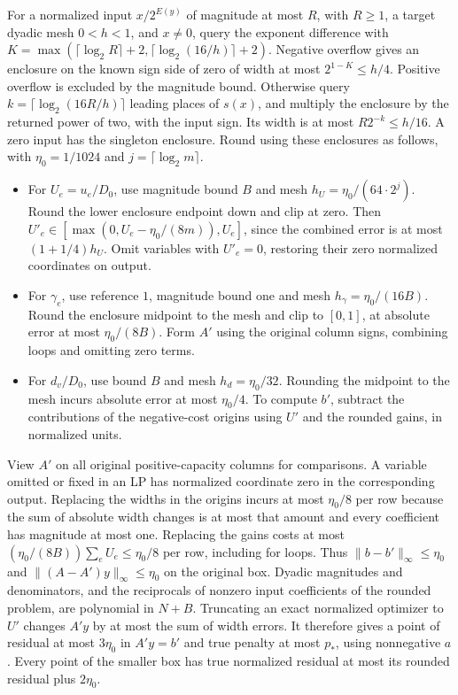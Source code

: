 \documentclass[11pt]{article}
\providecommand{\tightlist}{\setlength{\itemsep}{0pt}\setlength{\parskip}{0pt}}
\begin{document}
For a normalized input \(x/2^{E(y)}\) of magnitude at most \(R\), with \(R\ge1\), a target dyadic mesh \(0<h<1\), and \(x\ne0\), query the exponent difference with \(K=\max(\lceil\log_2 R\rceil+2,\lceil\log_2(16/h)\rceil+2)\). Negative overflow gives an enclosure on the known sign side of zero of width at most \(2^{1-K}\le h/4\). Positive overflow is excluded by the magnitude bound. Otherwise query \(k=\lceil\log_2(16R/h)\rceil\) leading places of \(s(x)\), and multiply the enclosure by the returned power of two, with the input sign. Its width is at most \(R2^{-k}\le h/16\). A zero input has the singleton enclosure. Round using these enclosures as follows, with \(\eta_0=1/1024\) and \(j=\lceil\log_2m\rceil\).

\begin{itemize}
\tightlist
\item
  For \(U_e=u_e/D_0\), use magnitude bound \(B\) and mesh \(h_U=\eta_0/(64\cdot 2^j)\). Round the lower enclosure endpoint down and clip at zero. Then \(U'_e\in[\max(0,U_e-\eta_0/(8m)),U_e]\), since the combined error is at most \((1+1/4)h_U\). Omit variables with \(U'_e=0\), restoring their zero normalized coordinates on output.
\item
  For \(\gamma_e\), use reference \(1\), magnitude bound one and mesh \(h_\gamma=\eta_0/(16B)\). Round the enclosure midpoint to the mesh and clip to \([0,1]\), at absolute error at most \(\eta_0/(8B)\). Form \(A'\) using the original column signs, combining loops and omitting zero terms.
\item
  For \(d_v/D_0\), use bound \(B\) and mesh \(h_d=\eta_0/32\). Rounding the midpoint to the mesh incurs absolute error at most \(\eta_0/4\). To compute \(b'\), subtract the contributions of the negative-cost origins using \(U'\) and the rounded gains, in normalized units.
\end{itemize}

View \(A'\) on all original positive-capacity columns for comparisons. A variable omitted or fixed in an LP has normalized coordinate zero in the corresponding output. Replacing the widths in the origins incurs at most \(\eta_0/8\) per row because the sum of absolute width changes is at most that amount and every coefficient has magnitude at most one. Replacing the gains costs at most \((\eta_0/(8B))\sum_e U_e\le\eta_0/8\) per row, including for loops. Thus \(\|b-b'\|_\infty\le\eta_0\) and \(\|(A-A')y\|_\infty\le\eta_0\) on the original box. Dyadic magnitudes and denominators, and the reciprocals of nonzero input coefficients of the rounded problem, are polynomial in \(N+B\). Truncating an exact normalized optimizer to \(U'\) changes \(A'y\) by at most the sum of width errors. It therefore gives a point of residual at most \(3\eta_0\) in \(A'y=b'\) and true penalty at most \(p_*\), using nonnegative \(a\). Every point of the smaller box has true normalized residual at most its rounded residual plus \(2\eta_0\).
\end{document}
